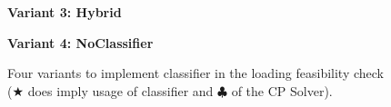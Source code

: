\begin{figure}[h]
    \begin{minipage}[t]{0.45\textwidth}
        \textbf{Variant 3: Hybrid}\par\vspace{0.5ex}
        \begin{algorithmic}[1]
            \EndWhile
        \end{algorithmic}
        \captionsetup{type=algorithm,font=small}
        \label{alg:variant3}
    \end{minipage}
    \hfill
    \begin{minipage}[t]{0.45\textwidth}
        \textbf{Variant 4: NoClassifier}\par\vspace{0.5ex}
        \begin{algorithmic}[1]
            \EndWhile
        \end{algorithmic}
        \captionsetup{type=algorithm,font=small}
        \label{alg:variant4}
    \end{minipage}

    \caption{Four variants to implement classifier in the loading feasibility check ($\bigstar$
        does imply usage of classifier and $\clubsuit$ of the CP Solver).}
    \label{fig:four_variants}
\end{figure}

